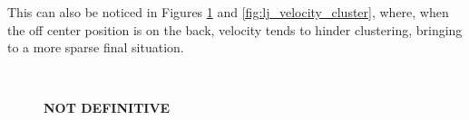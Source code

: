 \documentclass[../../master_thesis_np.tex]{subfiles}
\begin{document}
		This can also be noticed in Figures \ref{fig:lj_velocity_situation} and \ref{fig:lj_velocity_cluster}, where, when the off center position is on the back, velocity tends to hinder clustering, bringing to a more sparse final situation. 
		
		\begin{figure}[htp]
			\centering
			\\
			
			\caption{\textbf{NOT DEFINITIVE}  }
			\label{fig:lj_velocity_situation}
		\end{figure}
		
\end{document}
